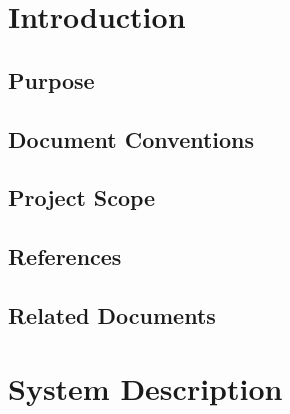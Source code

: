 \documentclass[12pt]{article}
\begin{document}
\section{Introduction}

	\subsection{Purpose}


	\subsection{Document Conventions}


	\subsection{Project Scope}


	\subsection{References}


	\subsection{Related Documents}



\section{System Description}
\end{document}
